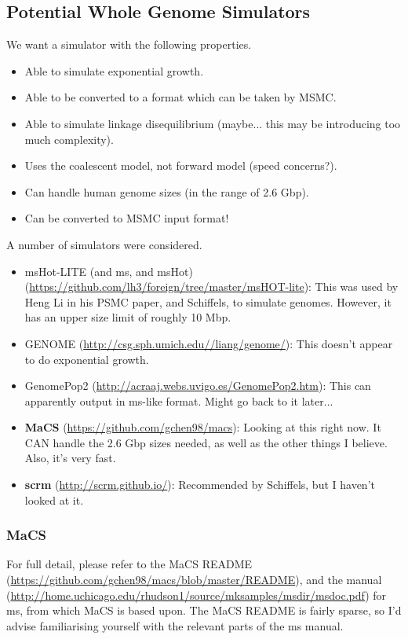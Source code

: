 \documentclass[11pt,a4paper]{article}
\begin{document}
\subsection{Potential Whole Genome Simulators}
We want a simulator with the following properties.
\begin{itemize}
\item Able to simulate exponential growth.
\item Able to be converted to a format which can be taken by MSMC.
\item Able to simulate linkage disequilibrium (maybe... this may be introducing too much complexity).
\item Uses the coalescent model, not forward model (speed concerns?).
\item Can handle human genome sizes (in the range of 2.6 Gbp).
\item Can be converted to MSMC input format!
\end{itemize}
A number of simulators were considered.
\begin{itemize}
\item msHot-LITE (and ms, and msHot) (\url{https://github.com/lh3/foreign/tree/master/msHOT-lite}): This was used by Heng Li in his PSMC paper\cite{li2011inference}, and Schiffels, to simulate genomes. However, it has an upper size limit of roughly 10 Mbp.
\item GENOME (\url{http://csg.sph.umich.edu//liang/genome/}): This doesn't appear to do exponential growth.
\item GenomePop2 (\url{http://acraaj.webs.uvigo.es/GenomePop2.htm}): This can apparently output in ms-like format. Might go back to it later...
\item \textbf{MaCS} (\url{https://github.com/gchen98/macs}): Looking at this right now. It CAN handle the 2.6 Gbp sizes needed, as well as the other things I believe. Also, it's very fast.
\item \textbf{scrm} (\url{http://scrm.github.io/}): Recommended by Schiffels, but I haven't looked at it.
\end{itemize}

\subsubsection{MaCS}
For full detail, please refer to the MaCS README (\url{https://github.com/gchen98/macs/blob/master/README}), and the manual (\url{http://home.uchicago.edu/rhudson1/source/mksamples/msdir/msdoc.pdf}) for ms\cite{hudson2002generating}, from which MaCS is based upon. The MaCS README is fairly sparse, so I'd advise familiarising yourself with the relevant parts of the ms manual.
\end{document}
